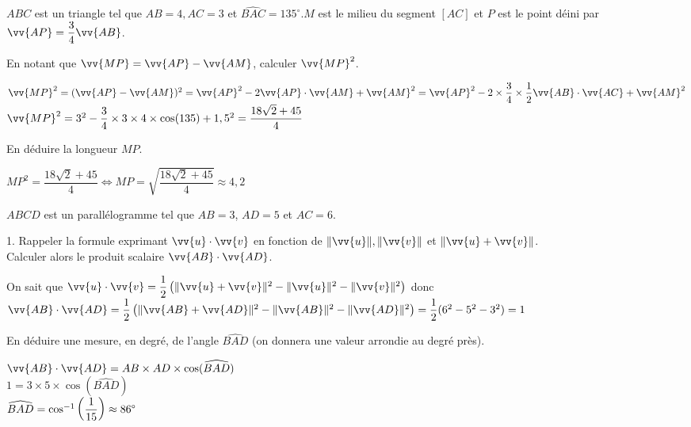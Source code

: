 \documentclass[11pt,a4paper]{article}  %
\begin{document}
\exerciceDS{}
$A B C$ est un triangle tel que $A B=4, A C=3$ et $\widehat{B A C}=135^{\circ} . M$ est le milieu du segment $[A C]$ et $P$ est le point déini par $\vv{A P}=\dfrac{3}{4} \vv{A B}$.
\begin{enumMet}
	\item En notant que $\vv{M P}=\vv{A P}-\vv{A M}$, calculer $\vv{M P}^2$.\\
	\begin{corrBox}
		$\vv{M P}^2=(\vv{A P}-\vv{A M})^2=\vv{A P}^2-2\vv{A P}\cdot\vv{A M}+\vv{A M}^2=\vv{A P}^2-2\times \dfrac{3}{4}\times\dfrac{1}{2}\vv{A B}\cdot\vv{A C}+\vv{A M}^2$\\
		$\vv{M P}^2=3^2-\dfrac{3}{4}\times3\times4\times\cos(135)+1,5^2=\dfrac{18\sqrt{2}+45}{4}$
	\end{corrBox}
	\item En déduire la longueur $M P$.\\
	\begin{corrBox}
		$MP^2=\dfrac{18\sqrt{2}+45}{4} \iff MP=\sqrt{\dfrac{18\sqrt{2}+45}{4}}\approx4,2$
	\end{corrBox}
\end{enumMet}

\exerciceDS{}
$A B C D$ est un parallélogramme tel que $A B=3$, $A D=5$ et $A C=6$.
\begin{enumMet}
	\item 1. Rappeler la formule exprimant $\vv{u} \cdot \vv{v}$ en fonction de $\|\vv{u}\|,\|\vv{v}\|$ et $\|\vv{u}+\vv{v}\|$.\\
	Calculer alors le produit scalaire $\vv{A B} \cdot \vv{A D}$.\\
	\begin{corrBox}
		On sait que $\vv{u} \cdot \vv{v}=\dfrac{1}{2}\left(\|\vv{u}+\vv{v}\|^{2}-\|\vv{u}\|^{2}-\|\vv{v}\|^{2}\right)$ donc\\
		$\vv{AB} \cdot \vv{AD}=\dfrac{1}{2}\left(\|\vv{AB}+\vv{AD}\|^{2}-\|\vv{AB}\|^{2}-\|\vv{AD}\|^{2}\right)=\dfrac{1}{2}(6^2-5^2-3^2)=1$
	\end{corrBox}   
	\item En déduire une mesure, en degré, de l'angle $\widehat{B A D}$ (on donnera une valeur arrondie au degré près).\\
	\begin{corrBox}
		$\vv{AB}\cdot\vv{AD}=AB\times AD\times\cos(\widehat{BAD})$\\
		$1=3\times5\times\cos(\widehat{BAD})$\\
		$\widehat{BAD}=\cos^{-1}\left(\dfrac{1}{15}\right)\approx86\degree$
	\end{corrBox}
\end{enumMet}
\end{document}

